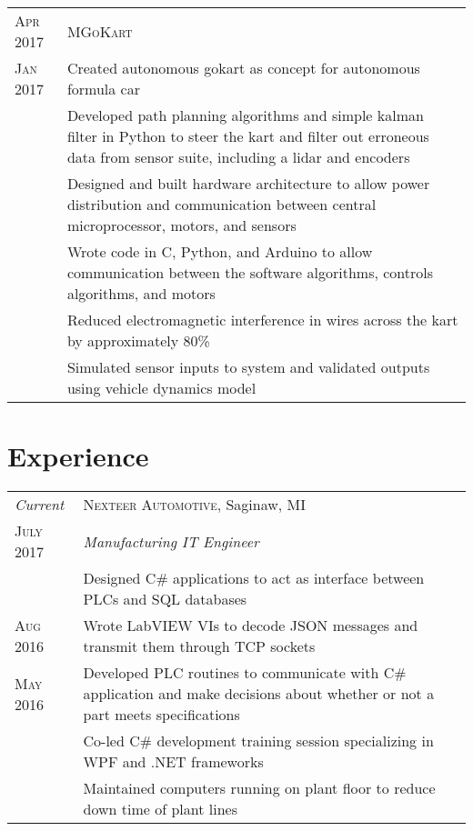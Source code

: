\documentclass[a4paper,12pt]{article} %
\begin{document}
\begin{tabular}{R{2.1cm}|p{15.5cm}}
\hspace{4pt}\textsc{Apr 2017} & \textsc{MGoKart} \\
\textsc{Jan 2017} & \footnotesize{Created autonomous gokart as concept for
 autonomous formula car} \\
& \footnotesize{Developed path planning algorithms and simple kalman filter in
  Python to steer the kart and filter out erroneous data from sensor suite,
  including a lidar and encoders} \\
& \footnotesize{Designed and built hardware architecture to allow power
 distribution and communication between central microprocessor, motors, and
 sensors} \\
& \footnotesize{Wrote code in C, Python, and Arduino to allow communication
 between the software algorithms, controls algorithms, and motors} \\
& \footnotesize{Reduced electromagnetic interference in wires across the kart by
 approximately 80\%} \\
& \footnotesize{Simulated sensor inputs to system and validated outputs using
 vehicle dynamics model} \\
\end{tabular}


\section{Experience}

\begin{tabular}{R{2.1cm}|p{15.5cm}}
\emph{Current} & \textsc{Nexteer Automotive}, Saginaw, MI \\
\textsc{July 2017} & \emph{Manufacturing IT Engineer} \\
& \footnotesize{Designed C\# applications to act as interface
  between PLCs and SQL databases} \\
\textsc{Aug 2016} & \footnotesize{Wrote LabVIEW VIs to decode JSON messages
  and transmit them through TCP sockets}\\
\textsc{May 2016} & \footnotesize{Developed PLC routines to communicate with C\#
  application and make decisions about whether or not a part meets specifications} \\
& \footnotesize{Co-led C\# development training session specializing in WPF and
 .NET frameworks}\\
& \footnotesize{Maintained computers running on plant floor to reduce down time
  of plant lines} \\
\end{tabular}
\end{document}
